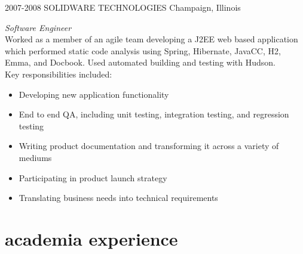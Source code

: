 \documentclass['print']{friggeri-cv} %
\begin{document}
\begin{entrylist}
\entry
{2007-2008}
{SOLIDWARE TECHNOLOGIES}
{Champaign, Illinois}
{\emph{Software Engineer} \\
Worked as a member of an agile team developing a J2EE web based application which performed static code analysis using Spring, Hibernate, JavaCC, H2, Emma, and Docbook. Used automated building and testing with Hudson. \\
Key responsibilities included:
\begin{itemize}
\item Developing new application functionality
\item End to end QA, including unit testing, integration testing, and regression testing
\item Writing product documentation and transforming it across a variety of mediums
\item Participating in product launch strategy
\item Translating business needs into technical requirements
\end{itemize}}
\end{entrylist}

\section{academia experience}
\end{document}
